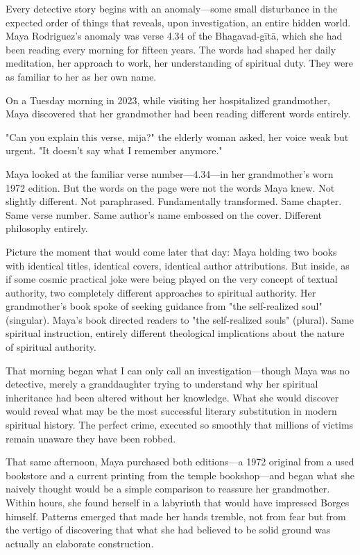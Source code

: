 \documentclass[12pt,twoside]{book}
\begin{document}
\normalfont\justifying
Every detective story begins with an anomaly—some small disturbance in the expected order of things that reveals, upon investigation, an entire hidden world. Maya Rodriguez's anomaly was verse 4.34 of the Bhagavad-gītā, which she had been reading every morning for fifteen years. The words had shaped her daily meditation, her approach to work, her understanding of spiritual duty. They were as familiar to her as her own name.

On a Tuesday morning in 2023, while visiting her hospitalized grandmother, Maya discovered that her grandmother had been reading different words entirely.

"Can you explain this verse, mija?" the elderly woman asked, her voice weak but urgent. "It doesn't say what I remember anymore."

Maya looked at the familiar verse number—4.34—in her grandmother's worn 1972 edition. But the words on the page were not the words Maya knew. Not slightly different. Not paraphrased. Fundamentally transformed. Same chapter. Same verse number. Same author's name embossed on the cover. Different philosophy entirely.

Picture the moment that would come later that day: Maya holding two books with identical titles, identical covers, identical author attributions. But inside, as if some cosmic practical joke were being played on the very concept of textual authority, two completely different approaches to spiritual authority. Her grandmother's book spoke of seeking guidance from "the self-realized soul" (singular). Maya's book directed readers to "the self-realized souls" (plural). Same spiritual instruction, entirely different theological implications about the nature of spiritual authority.

That morning began what I can only call an investigation—though Maya was no detective, merely a granddaughter trying to understand why her spiritual inheritance had been altered without her knowledge. What she would discover would reveal what may be the most successful literary substitution in modern spiritual history. The perfect crime, executed so smoothly that millions of victims remain unaware they have been robbed.

That same afternoon, Maya purchased both editions—a 1972 original from a used bookstore and a current printing from the temple bookshop—and began what she naively thought would be a simple comparison to reassure her grandmother. Within hours, she found herself in a labyrinth that would have impressed Borges himself. Patterns emerged that made her hands tremble, not from fear but from the vertigo of discovering that what she had believed to be solid ground was actually an elaborate construction.
\end{document}
